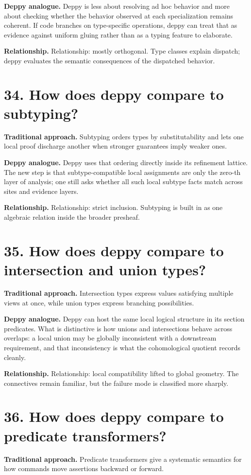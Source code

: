 \documentclass[11pt,openany]{book}
\begin{document}
\textbf{Deppy analogue.} Deppy is less about resolving ad hoc behavior and more about checking whether the behavior observed at each specialization remains coherent. If code branches on type-specific operations, deppy can treat that as evidence against uniform gluing rather than as a typing feature to elaborate.

\textbf{Relationship.} Relationship: mostly orthogonal. Type classes explain dispatch; deppy evaluates the semantic consequences of the dispatched behavior.

\section*{34. How does deppy compare to subtyping?}
\textbf{Traditional approach.} Subtyping orders types by substitutability and lets one local proof discharge another when stronger guarantees imply weaker ones.

\textbf{Deppy analogue.} Deppy uses that ordering directly inside its refinement lattice. The new step is that subtype-compatible local assignments are only the zero-th layer of analysis; one still asks whether all such local subtype facts match across sites and evidence layers.

\textbf{Relationship.} Relationship: strict inclusion. Subtyping is built in as one algebraic relation inside the broader presheaf.

\section*{35. How does deppy compare to intersection and union types?}
\textbf{Traditional approach.} Intersection types express values satisfying multiple views at once, while union types express branching possibilities.

\textbf{Deppy analogue.} Deppy can host the same local logical structure in its section predicates. What is distinctive is how unions and intersections behave across overlaps: a local union may be globally inconsistent with a downstream requirement, and that inconsistency is what the cohomological quotient records cleanly.

\textbf{Relationship.} Relationship: local compatibility lifted to global geometry. The connectives remain familiar, but the failure mode is classified more sharply.

\section*{36. How does deppy compare to predicate transformers?}
\textbf{Traditional approach.} Predicate transformers give a systematic semantics for how commands move assertions backward or forward.
\end{document}
